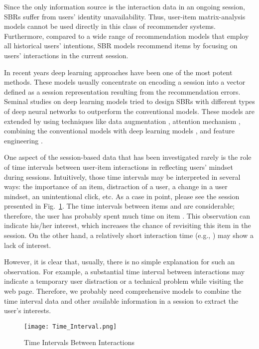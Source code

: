\documentclass[3p, preprint, times]{elsarticle}
\begin{document}
Since the only information source is the interaction data in an ongoing session, SBRs suffer from users' identity unavailability. Thus, user-item matrix-analysis models cannot be used directly in this class of recommender systems. Furthermore, compared to a wide range of recommendation models that employ all historical users' intentions, SBR models recommend items by focusing on users' interactions in the current session. 

In recent years deep learning approaches have been one of the most potent methods. These models usually concentrate on encoding a session into a vector defined as a session representation resulting from the recommendation errors. Seminal studies on deep learning models \cite{zhang2014sequential,hidasi2016session} tried to design SBRs with different types of deep neural networks to outperform the conventional models. These models are extended by using techniques like data augmentation \cite{tan2016improved}, attention mechanism \cite{li2017neural,liu2018stamp}, combining the conventional models with deep learning models \cite{jannach2017recurrent}, and feature engineering \cite{wu2019session}.

One aspect of the session-based data that has been investigated rarely is the role of time intervals between user-item interactions in reflecting users' mindset during sessions. Intuitively, those time intervals may be interpreted in several ways: the importance of an item, distraction of a user, a change in a user mindset, an unintentional click, etc. As a case in point, please see the session presented in Fig.~\ref{fig:Time_Interval}. The time intervals between items  and  are considerable; therefore, the user has probably spent much time on item . This observation can indicate his/her interest, which increases the chance of revisiting this item in the session. On the other hand, a relatively short interaction time (e.g., ) may show a lack of interest.

However, it is clear that, usually, there is no simple explanation for such an observation. For example, a substantial time interval between interactions may indicate a temporary user distraction or a technical problem while visiting the web page. Therefore, we probably need comprehensive models to combine the time interval data and other available information in a session to extract the user's interests.

\begin{figure}[h]
    \begin{center}
        \texttt{[image: Time\_Interval.png]}\\
        \caption{Time Intervals Between Interactions}
        \label{fig:Time_Interval}
    \end{center}
\end{figure}
\end{document}
